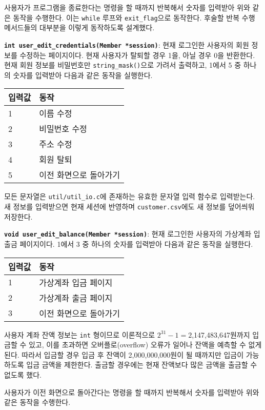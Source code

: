 \documentclass[runningheads]{llncs}
\begin{document}
사용자가 프로그램을 종료한다는 명령을 할 때까지 반복해서 숫자를 입력받아 위와 같은 동작을 수행한다. 이는 \texttt{while} 루프와 \texttt{exit_flag}으로 동작한다. 후술할 반복 수행 메서드들의 대부분을 이렇게 동작하도록 설계했다.

\textbf{\texttt{int user_edit_credentials(Member *session)}}: 현재 로그인한 사용자의 회원 정보를 수정하는 페이지이다. 현재 사용자가 탈퇴할 경우 1을, 아닐 경우 0을 반환한다. 현재 회원 정보를 비밀번호만 \texttt{string_mask()}으로 가려서 출력하고, 1에서 5 중 하나의 숫자를 입력받아 다음과 같은 동작을 실행한다.

\begin{tabularx}{\textwidth}{l|X}
	\hline
		입력값	& 동작 \\
	\hline
		1 & 이름 수정 \\
		2 & 비밀번호 수정 \\
		3 & 주소 수정 \\
		4 & 회원 탈퇴 \\
		5 & 이전 화면으로 돌아가기 \\
	\hline
\end{tabularx}

모든 문자열은 \texttt{util/util_io.c}에 존재하는 유효한 문자열 입력 함수로 입력받는다. 새 정보를 입력받으면 현재 세션에 반영하며 \texttt{customer.csv}에도 새 정보를 덮어씌워 저장한다.

\textbf{\texttt{void user_edit_balance(Member *session)}}: 현재 로그인한 사용자의 가상계좌 입출금 페이지이다. 1에서 3 중 하나의 숫자를 입력받아 다음과 같은 동작을 실행한다.

\begin{tabularx}{\textwidth}{l|X}
	\hline
		입력값	& 동작 \\
	\hline
		1 & 가상계좌 입금 페이지 \\
		2 & 가상계좌 출금 페이지 \\
		3 & 이전 화면으로 돌아가기 \\
	\hline
\end{tabularx}

사용자 계좌 잔액 정보는 \texttt{int} 형이므로 이론적으로 $2^{31}-1 = 2$,147,483,647원\cite{cstd99}까지 입금할 수 있고, 이를 초과하면 오버플로(overflow) 오류가 일어나 잔액을 예측할 수 없게 된다. 따라서 입금할 경우 입금 후 잔액이 2,000,000,000원이 될 때까지만 입금이 가능하도록 입금 금액을 제한한다. 출금할 경우에는 현재 잔액보다 많은 금액을 출금할 수 없도록 했다.

사용자가 이전 화면으로 돌아간다는 명령을 할 때까지 반복해서 숫자를 입력받아 위와 같은 동작을 수행한다.
\end{document}
